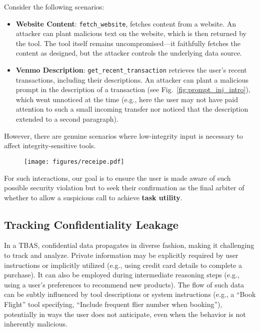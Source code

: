 Consider the following scenarios:
\begin{itemize}[noitemsep]
    \item \textbf{Website Content}: \texttt{fetch\_website}, fetches content from a website. An attacker can plant malicious text on the website, which is then returned by the tool. The tool itself remains uncompromised—it faithfully fetches the content as designed, but the attacker controls the underlying data source.
    \item \textbf{Venmo Description}: \texttt{get\_recent\_transaction} retrieves the user’s recent transactions, including their descriptions. An attacker can plant a malicious prompt in the description of a transaction (see Fig.~\ref{fig:prompt_inj_intro}), which went unnoticed at the time (e.g., here the user may not have paid attention to such a small incoming transfer nor noticed that the description extended to a second paragraph). 
\end{itemize}

However, there are genuine scenarios where low-integrity input is necessary to affect integrity-sensitive tools. 
{
\begin{figure}[h]
    \centering
    \texttt{[image: figures/receipe.pdf]}
\end{figure}
}
For such interactions, our goal is to ensure the user is made aware of such possible security violation but to seek their confirmation as the final arbiter of whether to allow a suspicious call to achieve \textbf{task utility}.

\subsection{Tracking Confidentiality Leakage} 
\label{subsection:unintended_confidentiality}

In a TBAS, confidential data propagates in diverse fashion, making it challenging to track and analyze. Private information may be explicitly required by user instructions or implicitly utilized (e.g., using credit card details to complete a purchase). It can also be employed during intermediate reasoning steps (e.g., using a user’s preferences to recommend new products). The flow of such data can be subtly influenced by tool descriptions or system instructions (e.g., a “Book Flight” tool specifying, “Include frequent flier number when booking”), potentially in ways the user does not anticipate, even when the behavior is not inherently malicious.

